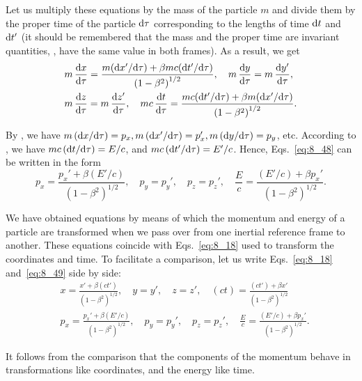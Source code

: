 Let us multiply these equations by the mass of the particle $m$ and divide them by the proper time of the particle $\mathrm{d}\tau$ corresponding to the lengths of time $\mathrm{d} t$ and $\mathrm{d} t'$ (it should be remembered that the mass and the proper time are invariant quantities, \ie, have the same value in both frames). As a result, we get
\begin{equation}\label{eq:8_48}
	\begin{split}
	&m\,\frac{\mathrm{d} x}{\mathrm{d}\tau} = \frac{m(\mathrm{d} x'/\mathrm{d}\tau)+\beta mc(\mathrm{d} t'/\mathrm{d}\tau)}{\left(1 - \beta^2\right)^{1/2}},\quad m\,\frac{\mathrm{d} y}{\mathrm{d}\tau} = m\,\frac{\mathrm{d} y'}{\mathrm{d}\tau},\\
	&m\,\frac{\mathrm{d} z}{\mathrm{d}\tau} = m\,\frac{\mathrm{d} z'}{\mathrm{d}\tau},\quad mc\,\frac{\mathrm{d} t}{\mathrm{d}\tau} = \frac{mc(\mathrm{d} t'/\mathrm{d}\tau)+\beta m(\mathrm{d} x'/\mathrm{d}\tau)}{\left(1 - \beta^2\right)^{1/2}}.
	\end{split}
\end{equation}

By , we have $m\,(\mathrm{d} x/\mathrm{d}\tau)=p_x, m\,(\mathrm{d} x'/\mathrm{d}\tau)=p_x', m\,(\mathrm{d} y/\mathrm{d}\tau)=p_y$, etc. According to , we have $mc\,(\mathrm{d} t/\mathrm{d}\tau)=E/c$, and $mc\,(\mathrm{d} t'/\mathrm{d}\tau)=E'/c$. Hence, Eqs.~\eqref{eq:8_48} can be written in the form
\begin{equation}\label{eq:8_49}
	p_x = \frac{p_x'+\beta(E'/c)}{\left(1 - \beta^2\right)^{1/2}},\quad p_y = p_y',\quad p_z = p_z',\quad \frac{E}{c} = \frac{(E'/c)+\beta p_x'}{\left(1 - \beta^2\right)^{1/2}}.
\end{equation}

We have obtained equations by means of which the momentum and energy of a particle are transformed when we pass over from one inertial reference frame to another. These equations coincide with Eqs.~\eqref{eq:8_18} used to transform the coordinates and time. To facilitate a comparison, let us write Eqs.~\eqref{eq:8_18} and~\eqref{eq:8_49} side by side:
\begin{equation}\label{eq:8_50}
	\begin{split}
		&x = \frac{x'+\beta(ct')}{\left(1 - \beta^2\right)^{1/2}},\quad y=y',\quad z=z',\quad (ct) = \frac{(ct')+\beta x'}{\left(1 - \beta^2\right)^{1/2}}\\
		&p_x = \frac{p_x'+\beta(E'/c)}{\left(1 - \beta^2\right)^{1/2}},\quad p_y = p_y',\quad p_z = p_z',\quad \frac{E}{c} = \frac{(E'/c)+\beta p_x'}{\left(1 - \beta^2\right)^{1/2}}.
	\end{split}
\end{equation}

\noindent
It follows from the comparison that the components of the momentum behave in transformations like coordinates, and the energy like time.

